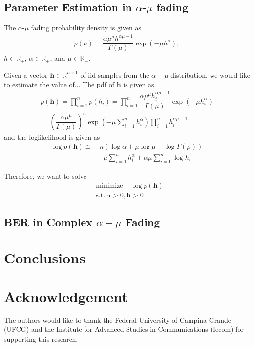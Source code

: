 \documentclass[conference, 10pt]{IEEEtran}
\begin{document}
\subsection{Parameter Estimation in $\alpha$-$\mu$ fading}

The $\alpha$-$\mu$ fading probability density is given as
\begin{align}
p(h) = \dfrac{\alpha \mu^\mu h^{\alpha\mu -1}}{\Gamma(\mu)}\exp\left(-\mu h^\alpha\right),
\end{align}
$h \in \mathbb{R}_{+}$, $\alpha \in \mathbb{R}_{+}$, and $\mu \in \mathbb{R}_{+}$.

Given a vector $\bm{h} \in \mathbb{R}^{n \times 1}$ of iid samples from the
$\alpha-\mu$ distribution, we would like to estimate the value of...
The pdf of $\bm{h}$ is given as
\begin{align}
    p(\bm{h}) = \prod_{i=1}^{n}p(h_i) = \prod_{i=1}^{n}\dfrac{\alpha \mu^\mu h_i^{\alpha\mu -1}}
    {\Gamma(\mu)}\exp\left(-\mu h_i^\alpha\right)\\
    = \left(\dfrac{\alpha \mu^\mu }{\Gamma(\mu)}\right)^{n}
    \exp\left(-\mu\sum_{i=1}^{n}h_i^{\alpha}\right)\prod_{i=1}^{n}h_i^{\alpha\mu -1}
\end{align}
and the loglikelihood is given as
\begin{align}
    \log p(\bm{h}) \cong
    &~n\left(\log\alpha + \mu \log \mu - \log \Gamma(\mu)\right) \nonumber\\
    & - \mu\sum_{i=1}^{n}h_i^{\alpha} + \alpha\mu\sum_{i=1}^{n}\log h_i
\end{align}

Therefore, we want to solve
\begin{align}
    & \text{minimize} -\log p(\bm{h})\\
    & \text{s.t.}~\alpha > 0, \bm{h} > 0 \nonumber
\end{align}

\subsection{BER in Complex $\alpha-\mu$ Fading}

\section{Conclusions}

\section*{Acknowledgement}
The authors would like to thank the Federal University of Campina Grande (UFCG)
and the Institute for Advanced Studies in Communications (Iecom) for supporting
this research.



\end{document}
